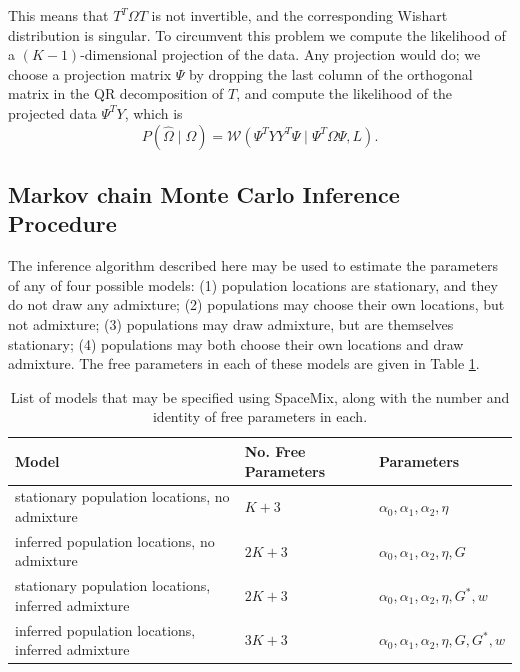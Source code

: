 \documentclass[12pt]{article}
\newcommand{\identifyadmixsource}[1]{{#1^{*}}}
\begin{document}
This means that $T^T \Omega T$ is not invertible, and the corresponding Wishart distribution is singular.
To circumvent this problem we compute the likelihood of a $(K-1)$-dimensional projection of the data.
Any projection would do; we choose a projection matrix $\Psi$ by dropping the last column of the orthogonal matrix in the QR decomposition of $T$,
and compute the likelihood of the projected data $\Psi^T Y$, which is
\begin{equation} \label{eq:projected_wishart_dist}
P(\widehat{\Omega} \mid \Omega) = \mathcal{W}\left( \Psi^T YY^T \Psi \mid  \Psi^{T}   \Omega   \Psi,L \right) \text{.}
\end{equation}

\subsection*{Markov chain Monte Carlo Inference Procedure}
The inference algorithm described here may be used to estimate the parameters of any of four possible models: (1) population locations are stationary, and they do not draw any admixture; (2) populations may choose their own locations, but not admixture; (3) populations may draw admixture, but are themselves stationary; (4) populations may both choose their own locations and draw admixture.  The free parameters in each of these models are given in Table \ref{tab:model_options}.

\begin{centering}
\begin{table}
\begin{tabular}{| >{\centering\arraybackslash}m{6cm} | >{\centering\arraybackslash}m{3cm} | l |}
	\hline
	\textbf{Model} & \textbf{No. Free Parameters} & \textbf{Parameters}\\ \hline
	stationary population locations, no admixture & $K + 3$	& $\alpha_0,\alpha_1,\alpha_2,\eta$	\\ \hline
	inferred population locations, \hspace{0.5cm}no admixture & $2K + 3$	& $\alpha_0,\alpha_1,\alpha_2,\eta,G$	\\ \hline
	stationary population locations, inferred admixture & $2K + 3$	& $\alpha_0,\alpha_1,\alpha_2,\eta,\identifyadmixsource{G},w$	\\ \hline
	inferred population locations, inferred admixture & $3K + 3$	&$\alpha_0,\alpha_1,\alpha_2,\eta,G,\identifyadmixsource{G},w$	\\
	\hline
\end{tabular}
\caption{
    List of models that may be specified using SpaceMix, along with the number and identity of free parameters in each.
}\label{tab:model_options}
\end{table}
\end{centering}
\end{document}
